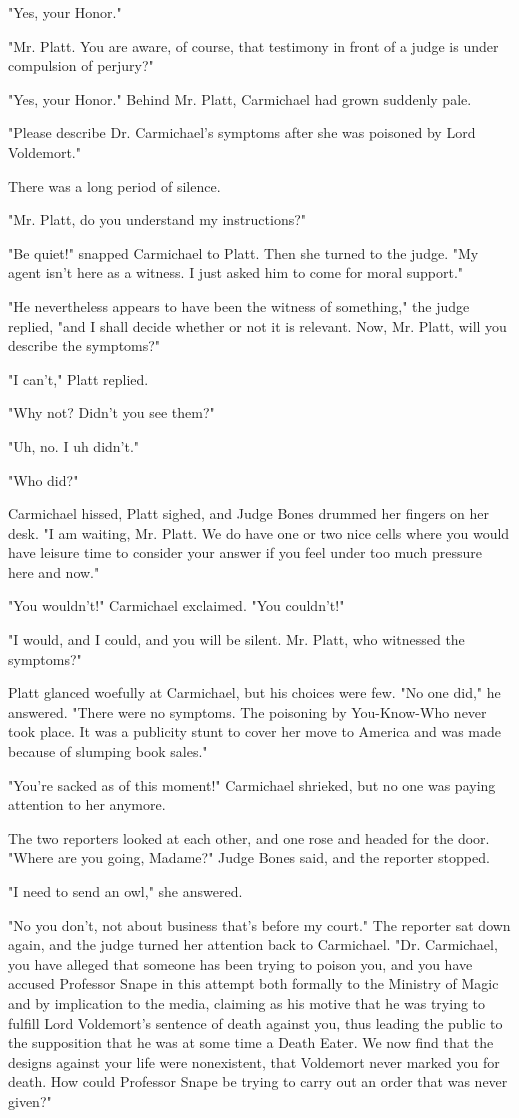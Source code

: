 "Yes, your Honor."

"Mr. Platt. You are aware, of course, that testimony in front of a judge is under compulsion of perjury?"

"Yes, your Honor." Behind Mr. Platt, Carmichael had grown suddenly pale.

"Please describe Dr. Carmichael's symptoms after she was poisoned by Lord Voldemort."

There was a long period of silence.

"Mr. Platt, do you understand my instructions?"

"Be quiet!" snapped Carmichael to Platt. Then she turned to the judge. "My agent isn't here as a witness. I just asked him to come for moral support."

"He nevertheless appears to have been the witness of something," the judge replied, "and I shall decide whether or not it is relevant. Now, Mr. Platt, will you describe the symptoms?"

"I can't," Platt replied.

"Why not? Didn't you see them?"

"Uh, no. I{\el} uh{\el} didn't."

"Who did?"

Carmichael hissed, Platt sighed, and Judge Bones drummed her fingers on her desk. "I am waiting, Mr. Platt. We do have one or two nice cells where you would have leisure time to consider your answer if you feel under too much pressure here and now."

"You wouldn't!" Carmichael exclaimed. "You couldn't!"

"I would, and I could, and you will be silent. Mr. Platt, who witnessed the symptoms?"

Platt glanced woefully at Carmichael, but his choices were few. "No one did," he answered. "There were no symptoms. The poisoning by You-Know-Who never took place. It was a publicity stunt to cover her move to America and was made because of slumping book sales."

"You're sacked as of this moment!" Carmichael shrieked, but no one was paying attention to her anymore.

The two reporters looked at each other, and one rose and headed for the door. "Where are you going, Madame?" Judge Bones said, and the reporter stopped.

"I need to send an owl," she answered.

"No you don't, not about business that's before my court." The reporter sat down again, and the judge turned her attention back to Carmichael. "Dr. Carmichael, you have alleged that someone has been trying to poison you, and you have accused Professor Snape in this attempt both formally to the Ministry of Magic and by implication to the media, claiming as his motive that he was trying to fulfill Lord Voldemort's sentence of death against you, thus leading the public to the supposition that he was at some time a Death Eater. We now find that the designs against your life were nonexistent, that Voldemort never marked you for death. How could Professor Snape be trying to carry out an order that was never given?"

